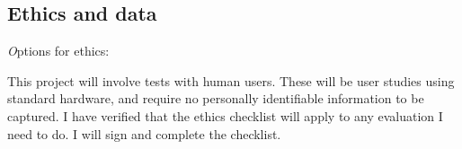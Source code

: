 \documentclass[11pt]{article}
\begin{document}
    
\subsection{Ethics and data}\label{ethics}
\emph
Options for ethics:

This project will involve tests with human users.  These will be user studies
using standard hardware, and require no personally identifiable information to be captured.
I have verified that the ethics checklist will apply to any evaluation I need to do. I will sign and complete the checklist.
\end{document}
